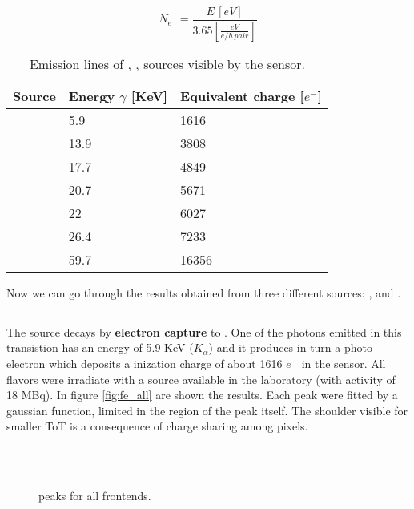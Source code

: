 \begin{equation}
N_{e^{-}} = \frac{E \, [eV]}{3.65 [\frac{eV}{e/h \, pair}]}
\label{energy_electron_conv}
\end{equation}



\begin{table}[h!]
\centering
\begin{tabular}{>{} C{3cm}|C{2.8cm}|C{2.8cm}}
Source & Energy $\gamma$ [KeV] & Equivalent charge [$e^{-}$]\\[2ex]
\hline
{} & 5.9 & 1616\\[0.5ex]
\hline
{} & 13.9 & 3808\\[0.5ex]
\hline
{} & 17.7 & 4849\\[0.5ex]
\hline
{} & 20.7 & 5671\\[0.5ex]
\hline
{} & 22 & 6027\\[0.5ex]
\hline
{} & 26.4 & 7233\\[0.5ex]
\hline
{} & 59.7 & 16356\\
\hline
\end{tabular}
\caption{Emission lines of , ,  sources visible by the sensor.}
\label{tab:radio_sources}
\end{table}


Now we can go through the results obtained from three different sources: ,  and .
\subsection{}

The  source decays by \textbf{electron capture} to . One of the photons emitted in this transistion has an energy of 5.9 KeV ($K_{\alpha}$) and it produces in turn a photo-electron which deposits a inization charge of about 1616 $e^{-}$ in the sensor. 
All flavors were irradiate with a  source available in the laboratory (with activity of 18 MBq). In figure \vref{fig:fe_all} are shown the results. Each peak were fitted by a gaussian function, limited in the region of the peak itself. The shoulder visible for smaller ToT is a consequence of charge sharing among pixels. 

\begin{figure}[h!]
\centering
{}\quad
{}\\
\quad
{}\\
\caption{ peaks for all frontends.}
\label{fig:fe_all}
\end{figure}

